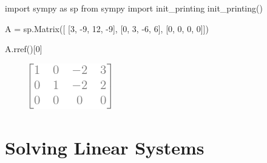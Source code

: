 \documentclass[
  letterpaper,
  DIV=11,
  numbers=noendperiod]{scrreprt}
\newenvironment{Shaded}{\begin{snugshade}}{\end{snugshade}}
\newcommand{\DecValTok}[1]{\textcolor[rgb]{0.68,0.00,0.00}{#1}}
\newcommand{\ImportTok}[1]{\textcolor[rgb]{0.00,0.46,0.62}{#1}}
\newcommand{\NormalTok}[1]{\textcolor[rgb]{0.00,0.23,0.31}{#1}}
\newcommand{\OperatorTok}[1]{\textcolor[rgb]{0.37,0.37,0.37}{#1}}
\begin{document}
\begin{Shaded}
\begin{Highlighting}[]
\ImportTok{import}\NormalTok{ sympy }\ImportTok{as}\NormalTok{ sp  }
\ImportTok{from}\NormalTok{ sympy }\ImportTok{import}\NormalTok{ init\_printing}
\NormalTok{init\_printing()}

\NormalTok{A }\OperatorTok{=}\NormalTok{ sp.Matrix([}
\NormalTok{    [}\DecValTok{3}\NormalTok{, }\OperatorTok{{-}}\DecValTok{9}\NormalTok{,  }\DecValTok{12}\NormalTok{,  }\OperatorTok{{-}}\DecValTok{9}\NormalTok{], }
\NormalTok{    [}\DecValTok{0}\NormalTok{,  }\DecValTok{3}\NormalTok{,  }\OperatorTok{{-}}\DecValTok{6}\NormalTok{,   }\DecValTok{6}\NormalTok{],}
\NormalTok{    [}\DecValTok{0}\NormalTok{,  }\DecValTok{0}\NormalTok{,   }\DecValTok{0}\NormalTok{,   }\DecValTok{0}\NormalTok{]])}

\NormalTok{A.rref()[}\DecValTok{0}\NormalTok{]}
\end{Highlighting}
\end{Shaded}

\begin{figure}[H]

{\centering \includegraphics{p2_files/figure-pdf/cell-4-output-1.png}

}

\end{figure}


\hypertarget{solving-linear-systems}{%
\chapter{Solving Linear Systems}\label{solving-linear-systems}}
\end{document}
